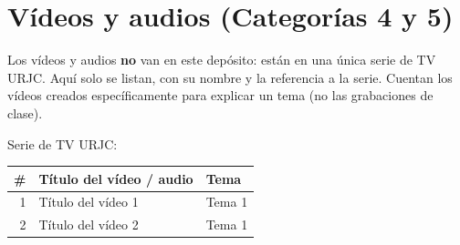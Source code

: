 \chapter{Vídeos y audios (Categorías 4 y 5)}

\begin{introcategoria}
Los vídeos y audios \textbf{no} van en este depósito: están en una única serie de
TV URJC. Aquí solo se listan, con su nombre y la referencia a la serie.
Cuentan los vídeos creados específicamente para explicar un tema (no las grabaciones de clase).
\end{introcategoria}

\noindent Serie de TV URJC: 

\bigskip
\begin{tabularx}{\textwidth}{@{}r X l@{}}
\toprule
\textbf{\#} & \textbf{Título del vídeo / audio} & \textbf{Tema}\\
\midrule
1 & Título del vídeo 1 & Tema 1\\
2 & Título del vídeo 2 & Tema 1\\
\bottomrule
\end{tabularx}
